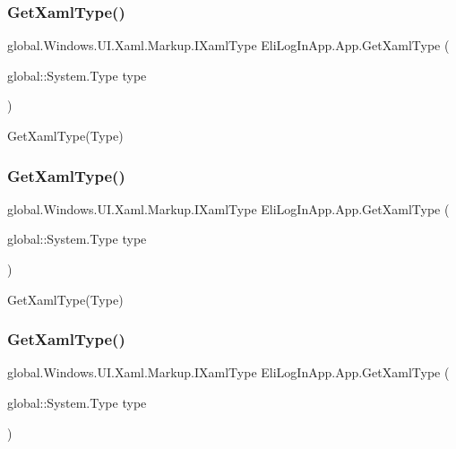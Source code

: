 \subsubsection{\texorpdfstring{Get\+Xaml\+Type()}{GetXamlType()}\hspace{0.1cm}{\footnotesize\ttfamily [1/6]}}
{\footnotesize\ttfamily global.\+Windows.\+U\+I.\+Xaml.\+Markup.\+I\+Xaml\+Type Eli\+Log\+In\+App.\+App.\+Get\+Xaml\+Type (\begin{DoxyParamCaption}\item[{global\+::\+System.\+Type}]{type }\end{DoxyParamCaption})\hspace{0.3cm}{\ttfamily [inline]}}



Get\+Xaml\+Type(\+Type) 

\mbox{\label{class_eli_log_in_app_1_1_app_a2942a44ac2e8363cf60e407fefefad14}} 
\subsubsection{\texorpdfstring{Get\+Xaml\+Type()}{GetXamlType()}\hspace{0.1cm}{\footnotesize\ttfamily [2/6]}}
{\footnotesize\ttfamily global.\+Windows.\+U\+I.\+Xaml.\+Markup.\+I\+Xaml\+Type Eli\+Log\+In\+App.\+App.\+Get\+Xaml\+Type (\begin{DoxyParamCaption}\item[{global\+::\+System.\+Type}]{type }\end{DoxyParamCaption})\hspace{0.3cm}{\ttfamily [inline]}}



Get\+Xaml\+Type(\+Type) 

\mbox{\label{class_eli_log_in_app_1_1_app_a2942a44ac2e8363cf60e407fefefad14}} 
\subsubsection{\texorpdfstring{Get\+Xaml\+Type()}{GetXamlType()}\hspace{0.1cm}{\footnotesize\ttfamily [3/6]}}
{\footnotesize\ttfamily global.\+Windows.\+U\+I.\+Xaml.\+Markup.\+I\+Xaml\+Type Eli\+Log\+In\+App.\+App.\+Get\+Xaml\+Type (\begin{DoxyParamCaption}\item[{global\+::\+System.\+Type}]{type }\end{DoxyParamCaption})\hspace{0.3cm}{\ttfamily [inline]}}




